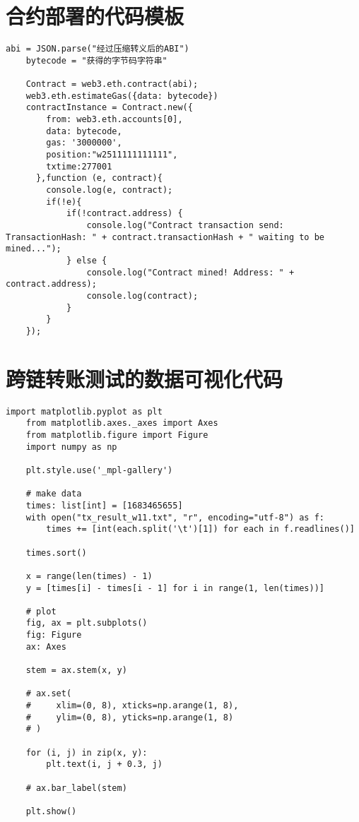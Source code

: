 \begin{appendices}
  \section{合约部署的代码模板}

  \begin{lstlisting}[caption={合约部署代码模板}, label={lst:合约部署代码模板}]
    abi = JSON.parse("经过压缩转义后的ABI")
    bytecode = "获得的字节码字符串"

    Contract = web3.eth.contract(abi);
    web3.eth.estimateGas({data: bytecode})
    contractInstance = Contract.new({
        from: web3.eth.accounts[0],
        data: bytecode,
        gas: '3000000',
        position:"w2511111111111",
        txtime:277001
      },function (e, contract){
        console.log(e, contract);
        if(!e){
            if(!contract.address) {
                console.log("Contract transaction send: TransactionHash: " + contract.transactionHash + " waiting to be mined...");
            } else {
                console.log("Contract mined! Address: " + contract.address);
                console.log(contract);
            }
        }
    });
\end{lstlisting}

  \section{跨链转账测试的数据可视化代码}
  \begin{lstlisting}[caption={跨链转账测试的数据可视化}, label={lst:跨链转账测试的数据可视化}]
    import matplotlib.pyplot as plt
    from matplotlib.axes._axes import Axes
    from matplotlib.figure import Figure
    import numpy as np

    plt.style.use('_mpl-gallery')

    # make data
    times: list[int] = [1683465655]
    with open("tx_result_w11.txt", "r", encoding="utf-8") as f:
        times += [int(each.split('\t')[1]) for each in f.readlines()]

    times.sort()

    x = range(len(times) - 1)
    y = [times[i] - times[i - 1] for i in range(1, len(times))]

    # plot
    fig, ax = plt.subplots()
    fig: Figure
    ax: Axes

    stem = ax.stem(x, y)

    # ax.set(
    #     xlim=(0, 8), xticks=np.arange(1, 8),
    #     ylim=(0, 8), yticks=np.arange(1, 8)
    # )

    for (i, j) in zip(x, y):
        plt.text(i, j + 0.3, j)

    # ax.bar_label(stem)

    plt.show()
  \end{lstlisting}
\end{appendices}
